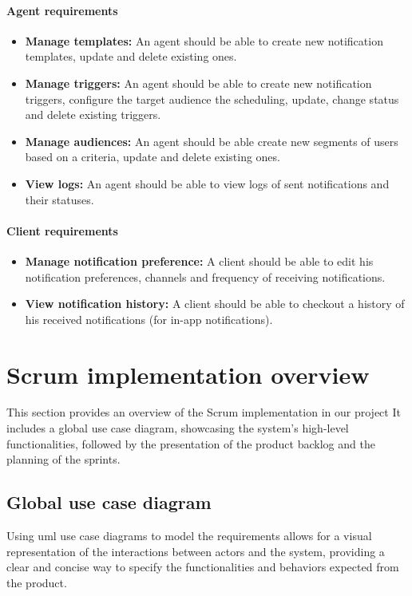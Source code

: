 \paragraph*{Agent requirements}
\label{agent-req}
\begin{itemize}
      \item \textbf{Manage templates:} An agent should be able to create new notification templates, update and
            delete existing ones.
      \item \textbf{Manage triggers:} An agent should be able to create new notification triggers, configure
            the target audience the scheduling, update, change status and delete existing triggers.
      \item \textbf{Manage audiences:} An agent should be able create new segments of users based on a
            criteria, update and delete existing ones.
      \item \textbf{View logs:} An agent should be able to view logs of sent notifications and their statuses.
\end{itemize}

\paragraph*{Client requirements}
\label{client-req}
\begin{itemize}
      \item \textbf{Manage notification preference:} A client should be able to edit his notification preferences,
            channels and frequency of receiving notifications.
      \item \textbf{View notification history:} A client should be able to checkout a history of his received
            notifications (for in-app notifications).
\end{itemize}


\section{Scrum implementation overview}
\label{spec}
This section provides an overview of the Scrum implementation in our project It includes a global use case diagram, showcasing the system's
high-level functionalities, followed by the presentation of the product backlog and the planning
of the sprints.

\subsection{Global use case diagram}
Using \acrshort{uml} use case diagrams to model the requirements allows for a visual representation
of the interactions between actors and the system, providing a clear and concise way to specify
the functionalities and behaviors expected from the product.


